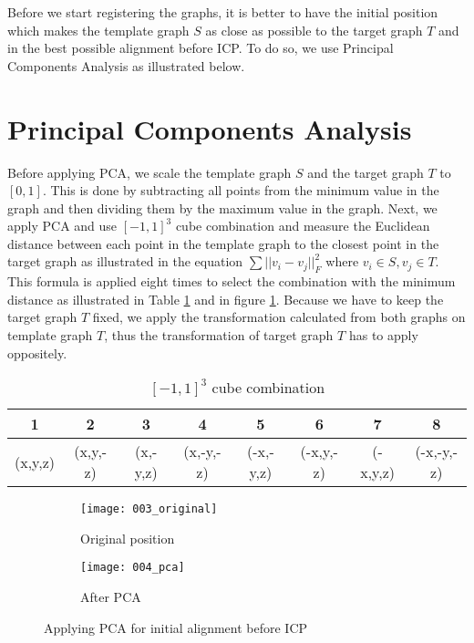 \documentclass[../structure.tex]{subfiles}
\begin{document}
\hspace{2em}Before we start registering the graphs, it is better to have the initial position which makes the template graph $S$ as close as possible to the target graph $T$ and in the best possible alignment before ICP. To do so, we use Principal Components Analysis as illustrated below.

\section{Principal Components Analysis }
\hspace{2em}Before applying PCA, we scale the template graph $S$ and the target graph $T$ to $[0,1]$. This is done by subtracting all points from the minimum value in the graph and then dividing them by the maximum value in the graph. Next, we apply PCA and use $[-1,1]^3$ cube combination and measure the Euclidean distance between each point in the template graph to the closest point in the target graph as illustrated in the equation $\sum ||v_i-v_j||_F^2$ where $v_i \in S, v_j \in T$. This formula is applied eight times to select the combination with the minimum distance as illustrated in Table \ref{table:cube} and in figure \ref{fig:pca}. Because we have to keep the target graph $T$ fixed, we apply the transformation calculated from both graphs on template graph $T$, thus the transformation of target graph $T$ has to apply oppositely.
\vspace{2em}
\begin{center}
\begin{table}[h]
	\begin{tabular}{| c | c | c | c | c | c | c | c |}
	\hline
	1 & 2 & 3 & 4 & 5 & 6 & 7 & 8\\
	\hline
	(x,y,z) & (x,y,-z) & (x,-y,z) & (x,-y,-z) & (-x,-y,z) & (-x,y,-z) & (-x,y,z) & (-x,-y,-z)\\
	\hline
	\end{tabular}
\caption{$[-1,1]^3$ cube combination}
\label{table:cube}
\end{table}
\end{center}

\begin{figure}[h!]
	\centering
	\begin{subfigure}[b]{0.59\textwidth}
	\texttt{[image: 003\_original]}
	\caption{Original position}
	\end{subfigure}
	\begin{subfigure}[b]{0.40\textwidth}
	\texttt{[image: 004\_pca]}
	\caption{After PCA}
	\end{subfigure}
\caption{Applying PCA for initial alignment before ICP}
\label{fig:pca}
\end{figure}
\end{document}
